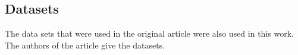 \subsection*{Datasets}
 
The data sets that were used in the original article were also used in this work. The authors of the article give the datasets. \\

